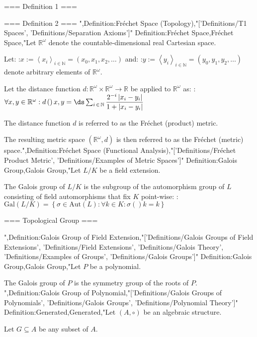 === Definition 1 ===



=== Definition 2 ===
",Definition:Fréchet Space (Topology),"['Definitions/T1 Spaces', 'Definitions/Separation Axioms']"
Definition:Fréchet Space,Fréchet Space,"Let $\mathbb R^\omega$ denote the countable-dimensional real Cartesian space.

Let:
:$x := \left\langle x_i \right\rangle_{i \mathop \in \mathbb N} = \left( x_0, x_1, x_2, \ldots \right)$
and:
:$y := \left\langle y_i \right\rangle_{i \mathop \in \mathbb N} = \left( y_0, y_1, y_2, \ldots \right)$
denote arbitrary elements of $\mathbb R^\omega$.


Let the distance function $d: \mathbb R^\omega \times \mathbb R^\omega \to \mathbb R$ be applied to $\mathbb R^\omega$ as:
:$\forall x, y \in \mathbb R^\omega: d \left(   \right){x, y} = \ds \sum_{i \mathop \in \mathbb N} \dfrac {2^{-i} \left\lvert x_i - y_i \right\rvert } {1 + \left\lvert x_i - y_i \right\rvert }$


The distance function $d$ is referred to as the Fréchet (product) metric.


The resulting metric space $\left( \mathbb R^\omega, d \right)$ is then referred to as the Fréchet (metric) space.",Definition:Fréchet Space (Functional Analysis),"['Definitions/Fréchet Product Metric', 'Definitions/Examples of Metric Spaces']"
Definition:Galois Group,Galois Group,"Let $L / K$ be a field extension.


The Galois group of $L / K$ is the subgroup of the automorphism group of $L$ consisting of field automorphisms that fix $K$ point-wise:
:$\mathrm {Gal} \left( L / K \right) = \left\lbrace \sigma \in \mathrm {Aut} \left( L \right): \forall k \in K: \sigma \left(   \right)k = k \right\rbrace$


=== Topological Group ===

",Definition:Galois Group of Field Extension,"['Definitions/Galois Groups of Field Extensions', 'Definitions/Field Extensions', 'Definitions/Galois Theory', 'Definitions/Examples of Groups', 'Definitions/Galois Groups']"
Definition:Galois Group,Galois Group,"Let $P$ be a polynomial.

The Galois group of $P$ is the symmetry group of the roots of $P$.
",Definition:Galois Group of Polynomial,"['Definitions/Galois Groups of Polynomials', 'Definitions/Galois Groups', 'Definitions/Polynomial Theory']"
Definition:Generated,Generated,"Let $\left( A, \circ \right)$ be an algebraic structure.

Let $G \subseteq A$ be any subset of $A$.


